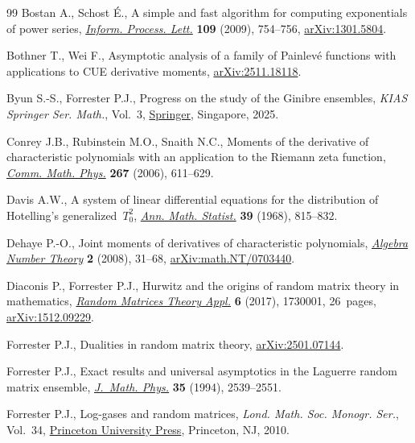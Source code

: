 \documentclass[pdftex]{sigma}
\numberwithin{equation}{section}
\theoremstyle{definition}
\begin{document}
\begin{thebibliography}{99}
Bostan A., Schost {\'{E}}., A simple and fast algorithm for computing
 exponentials of power series,
 \href{https://doi.org/10.1016/j.ipl.2009.03.012}{\textit{Inform. Process.
 Lett.}} \textbf{109} (2009), 754--756,
 \href{http://arxiv.org/abs/1301.5804}{arXiv:1301.5804}.

Bothner T., Wei F., Asymptotic analysis of a family of {P}ainlev\'e functions
 with applications to CUE derivative moments,
 \href{http://arxiv.org/abs/2511.18118}{arXiv:2511.18118}.

Byun S.-S., Forrester P.J., Progress on the study of the {G}inibre ensembles,
 \textit{KIAS Springer Ser. Math.}, Vol.~3,
 \href{https://doi.org/10.1007/978-981-97-5173-0}{Springer}, Singapore, 2025.

Conrey J.B., Rubinstein M.O., Snaith N.C., Moments of the derivative of
 characteristic polynomials with an application to the {R}iemann zeta
 function, \href{https://doi.org/10.1007/s00220-006-0090-5}{\textit{Comm.
 Math. Phys.}} \textbf{267} (2006), 611--629.

Davis A.W., A system of linear differential equations for the distribution of
 {H}otelling's generalized~{$T_{0}^{2}$},
 \href{https://doi.org/10.1214/aoms/1177698313}{\textit{Ann. Math. Statist.}}
 \textbf{39} (1968), 815--832.

Dehaye P.-O., Joint moments of derivatives of characteristic polynomials,
 \href{https://doi.org/10.2140/ant.2008.2.31}{\textit{Algebra Number Theory}}
 \textbf{2} (2008), 31--68,
 \href{http://arxiv.org/abs/math.NT/0703440}{arXiv:math.NT/0703440}.

Diaconis P., Forrester P.J., Hurwitz and the origins of random matrix theory in
 mathematics, \href{https://doi.org/10.1142/S2010326317300017}{\textit{Random
 Matrices Theory Appl.}} \textbf{6} (2017), 1730001, 26~pages,
 \href{http://arxiv.org/abs/1512.09229}{arXiv:1512.09229}.

Forrester P.J., Dualities in random matrix theory,
 \href{http://arxiv.org/abs/2501.07144}{arXiv:2501.07144}.

Forrester P.J., Exact results and universal asymptotics in the {L}aguerre
 random matrix ensemble,
 \href{https://doi.org/10.1063/1.530883}{\textit{J.~Math. Phys.}} \textbf{35}
 (1994), 2539--2551.

Forrester P.J., Log-gases and random matrices, \textit{Lond. Math. Soc. Monogr.
 Ser.}, Vol.~34, \href{https://doi.org/10.1515/9781400835416}{Princeton
 University Press}, Princeton, NJ, 2010.


\end{thebibliography}
\end{document}
